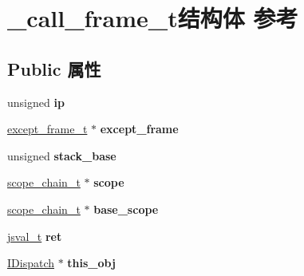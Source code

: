 \hypertarget{struct__call__frame__t}{}\section{\+\_\+call\+\_\+frame\+\_\+t结构体 参考}
\label{struct__call__frame__t}
\subsection*{Public 属性}
\begin{DoxyCompactItemize}
\item 
\mbox{\label{struct__call__frame__t_a40196cc07f8db49a63ad75d7810b46e7}} 
unsigned {\bfseries ip}
\item 
\mbox{\label{struct__call__frame__t_a19fb0f4d8b47fd3cc2ea7d72def2c229}} 
\hyperlink{struct__except__frame__t}{except\+\_\+frame\+\_\+t} $\ast$ {\bfseries except\+\_\+frame}
\item 
\mbox{\label{struct__call__frame__t_afe11bf5b64b5e4301413da28870d7518}} 
unsigned {\bfseries stack\+\_\+base}
\item 
\mbox{\label{struct__call__frame__t_ad65b90a39141c2b1af552910a45f2bc6}} 
\hyperlink{struct__scope__chain__t}{scope\+\_\+chain\+\_\+t} $\ast$ {\bfseries scope}
\item 
\mbox{\label{struct__call__frame__t_a79c04f0d41809e3b58c844a21dbd6628}} 
\hyperlink{struct__scope__chain__t}{scope\+\_\+chain\+\_\+t} $\ast$ {\bfseries base\+\_\+scope}
\item 
\mbox{\label{struct__call__frame__t_ae159cbd62b4f68904482c5c2381f8437}} 
\hyperlink{struct__jsval__t}{jsval\+\_\+t} {\bfseries ret}
\item 
\mbox{\label{struct__call__frame__t_a1501405964e6e8efa19b867487432248}} 
\hyperlink{interface_i_dispatch}{I\+Dispatch} $\ast$ {\bfseries this\+\_\+obj}
\item 
\mbox{\label{struct__call__frame__t_aecbbd477b02fc62f2bdf44479812986b}} 

\end{DoxyCompactItemize}
